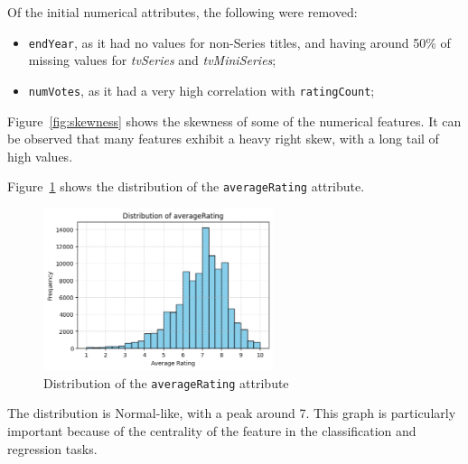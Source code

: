 Of the initial numerical attributes, the following were removed:
\begin{itemize}
    \item \texttt{endYear}, as it had no values for non-Series titles, and having around 50\% of missing values for \textit{tvSeries} and
\textit{tvMiniSeries};
    \item \texttt{numVotes}, as it had a very high correlation with \texttt{ratingCount};
\end{itemize}

Figure~\ref{fig:skewness} shows the skewness of some of the numerical features.
It can be observed that many features exhibit a heavy right skew, with a long tail of high values.

    
Figure~\ref{fig:rating_dist} shows the distribution of the
\texttt{averageRating} attribute.
\begin{figure}[H]
    \centering
    \includegraphics[width=0.6\textwidth]{plotsss/rating_distrib.png}
    \caption{Distribution of the \texttt{averageRating} attribute}
    \label{fig:rating_dist}
\end{figure}
The distribution is Normal-like, with a peak around 7.
This graph is particularly important because of the centrality
of the feature in the classification and regression tasks.

